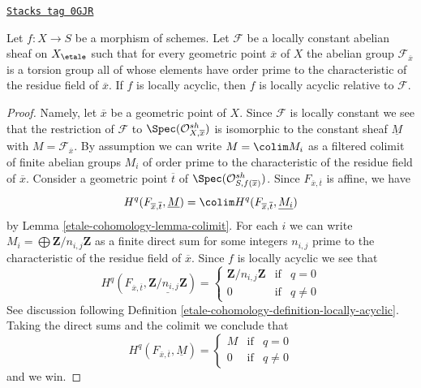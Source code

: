 \begin{lemma}
\label{etale-cohomology-lemma-locally-acyclic-locally-constant}
\href{https://stacks.math.columbia.edu/tag/0GJR}{\texttt{Stacks tag 0GJR}}

Let $f : X \to S$ be a morphism of schemes. Let $\mathcal{F}$ be a
locally constant abelian sheaf on $X_\etale$ such that for every geometric
point $\overline{x}$ of $X$ the abelian group
$\mathcal{F}_{\overline{x}}$ is a torsion group all of whose elements have
order prime to the characteristic of the
residue field of $\overline{x}$. If $f$ is locally acyclic, then $f$ is
locally acyclic relative to $\mathcal{F}$.
\end{lemma}

\begin{proof}
Namely, let $\overline{x}$ be a geometric point of $X$.
Since $\mathcal{F}$ is locally constant we see that
the restriction of $\mathcal{F}$ to $\Spec(\mathcal{O}^{sh}_{X, \overline{x}})$
is isomorphic to the constant sheaf $\underline{M}$ with
$M = \mathcal{F}_{\overline{x}}$. By assumption we can write
$M = \colim M_i$ as a filtered colimit of finite abelian groups
$M_i$ of order prime to the characteristic of the residue field of
$\overline{x}$. Consider a geometric point $\overline{t}$ of
$\Spec(\mathcal{O}^{sh}_{S, f(\overline{x})})$.
Since $F_{\overline{x}, \overline{t}}$ is affine, we have
$$
H^q(F_{\overline{x}, \overline{t}}, \underline{M}) =
\colim H^q(F_{\overline{x}, \overline{t}}, \underline{M_i})
$$
by Lemma \ref{etale-cohomology-lemma-colimit}.
For each $i$ we can write $M_i = \bigoplus \mathbf{Z}/n_{i, j}\mathbf{Z}$
as a finite direct sum for some integers $n_{i, j}$ prime to the
characteristic of the residue field of $\overline{x}$.
Since $f$ is locally acyclic we see that
$$
H^q(F_{\overline{x}, \overline{t}},
\underline{\mathbf{Z}/n_{i, j}\mathbf{Z}}) =
\left\{
\begin{matrix}
\mathbf{Z}/n_{i, j}\mathbf{Z} & \text{if} & q = 0 \\
0 & \text{if} & q \not = 0
\end{matrix}
\right.
$$
See discussion following Definition \ref{etale-cohomology-definition-locally-acyclic}.
Taking the direct sums and the colimit we conclude that
$$
H^q(F_{\overline{x}, \overline{t}}, \underline{M}) =
\left\{
\begin{matrix}
M & \text{if} & q = 0 \\
0 & \text{if} & q \not = 0
\end{matrix}
\right.
$$
and we win.
\end{proof}

